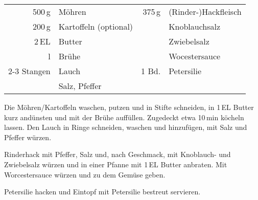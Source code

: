 \begin{table}[H]
  \centering
    
  \begin{tabular*}{1\textwidth}{rlrl}
    500\,g & M\"{o}hren  & 375\,g & (Rinder-)Hackfleisch \\
	200\,g & Kartoffeln (optional) & & Knoblauchsalz \\
	2\,EL & Butter & & Zwiebelsalz \\
	\nicefrac{1}{2}\,l & Br\"{u}he &  & Wocestersauce \\
	2-3 Stangen & Lauch & 1 Bd.& Petersilie \\
	& Salz, Pfeffer &  & \\
  \end{tabular*}
\end{table}

\begin{Notes}
\item Die M\"{o}hren/Kartoffeln waschen, putzen und in Stifte schneiden, in 1\,EL Butter kurz and\"{u}nsten und mit der Br\"{u}he auff\"{u}llen. Zugedeckt etwa 10\,min k\"{o}cheln lassen. Den Lauch in Ringe schneiden, waschen und hinzuf\"{u}gen, mit Salz und Pfeffer w\"{u}rzen.
\item Rinderhack mit Pfeffer, Salz und, nach Geschmack, mit Knoblauch- und Zwiebelsalz w\"{u}rzen und in einer Pfanne mit 1\,EL Butter anbraten. Mit Worcestersauce w\"{u}rzen und zu dem Gem\"{u}se geben.
\item Petersilie hacken und Eintopf mit Petersilie bestreut servieren.
\end{Notes}
